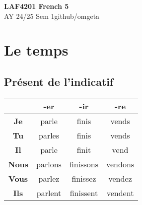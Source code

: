 \documentclass[12pt, a4paper]{article}
\newcommand{\mytitle}{LAF4201 French 5}
\newcommand{\myauthor}{github/omgeta}
\newcommand{\mydate}{AY 24/25 Sem 1}
\begin{document}
\raggedright
\footnotesize
\begin{multicols*}{3}
\setlength{\premulticols}{1pt}
\setlength{\postmulticols}{1pt}
\setlength{\multicolsep}{1pt}
\setlength{\columnsep}{2pt}

{\normalsize{\textbf{\mytitle}}} \\
{\footnotesize{\mydate\hspace{2pt}\textemdash\hspace{2pt}\myauthor}}

\section{Le temps}
\subsection{Présent de l'indicatif}
\begin{center}
\begin{tabular}{|c|c|c|c|}
  \hline
  & \textbf{-er} & \textbf{-ir} & \textbf{-re}\\\hline
  \textbf{Je} & parle & finis & vends \\\hline
  \textbf{Tu} & parles & finis & vends \\\hline
  \textbf{Il} & parle & finit & vend \\\hline
  \textbf{Nous} & parlons & finissons & vendons \\\hline
  \textbf{Vous} & parlez & finissez & vendez \\\hline
  \textbf{Ils} & parlent & finissent & vendent \\\hline
\end{tabular}
\end{center}


\end{multicols*}
\end{document}
